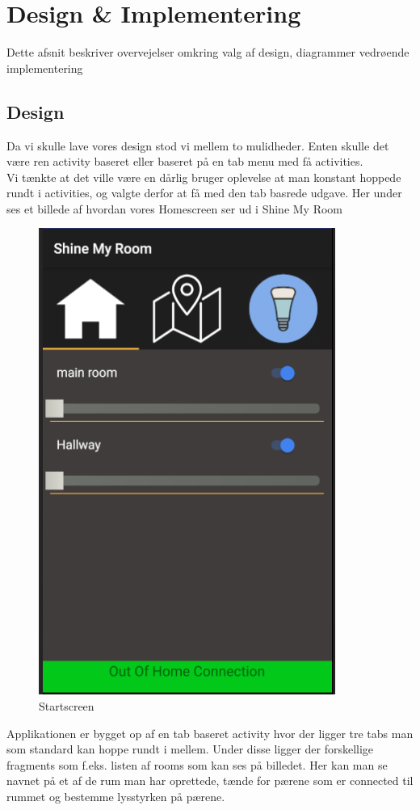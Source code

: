 \chapter{Design \& Implementering}

Dette afsnit beskriver overvejelser omkring valg af design, diagrammer vedrøende implementering

\section{Design}
Da vi skulle lave vores design stod vi mellem to mulidheder. Enten skulle det være ren activity baseret eller baseret på en tab menu med få activities. \\
Vi tænkte at det ville være en dårlig bruger oplevelse at man konstant hoppede rundt i activities, og valgte derfor at få med den tab basrede udgave.
Her under ses et billede af hvordan vores Homescreen ser ud i Shine My Room

\begin{figure}[H]
	\centering
	\includegraphics[width=0.5\linewidth, height=0.7\linewidth]{Design/Startscreen}
	\caption{Startscreen}
	\label{fig:Startscreen}
\end{figure}
Applikationen er bygget op af en tab baseret activity hvor der ligger tre tabs man som standard kan hoppe rundt i mellem. Under disse ligger der forskellige fragments som f.eks. listen af rooms som kan ses på billedet. Her kan man se navnet på et af de rum man har oprettede, tænde for pærene som er connected til rummet og bestemme lysstyrken på pærene.


